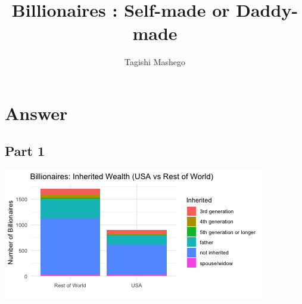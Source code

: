 \documentclass[11pt,preprint]{elsarticle}
\let\origfigure\figure
\let\endorigfigure\endfigure
\renewenvironment{figure}[1][2] {
    \expandafter\origfigure\expandafter[H]
} {
    \endorigfigure
}
\numberwithin{equation}{section}
\numberwithin{figure}{section}
\numberwithin{table}{section}
\begin{document}
\begin{frontmatter}  %

\title{Billionaires : Self-made or Daddy-made}





\author[Add1]{Tagishi Mashego}
\ead{}








\vspace{1cm}





\vspace{0.5cm}

\end{frontmatter}

\setcounter{footnote}{0}



\pagestyle{fancy}
\chead{}
\rhead{}
\lfoot{}
\lhead{}
\cfoot{}


\headsep 35pt %




\section{Answer}\label{answer}

\subsection{Part 1}\label{part-1}

\begin{figure}[H]

{\centering \includegraphics{Question4_files/figure-latex/Figure1-1} 

}

\caption{Billionaire Comparison \label{Figure1}}\label{fig:Figure1}
\end{figure}
\end{document}
